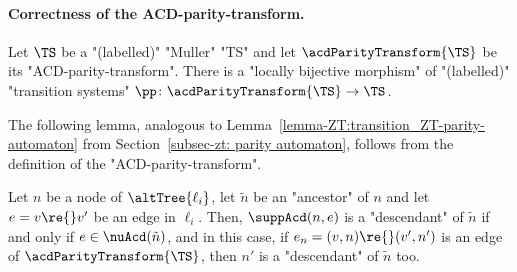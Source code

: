 \documentclass{theoretics}
\begin{document}
\paragraph*{Correctness of the ACD-parity-transform.}

\begin{proposition}\label{prop-ACD:correctness_ACD-parity_transform}
	Let $\TS$ be a "(labelled)" "Muller" "TS" and let $\acdParityTransform{\TS}$ be its "ACD-parity-transform". There is a "locally bijective morphism" of "(labelled)" "transition systems" $\pp\colon \acdParityTransform{\TS} \to \TS$.
\end{proposition}

The following lemma, analogous to Lemma~\ref{lemma-ZT:transition_ZT-parity-automaton} from Section~\ref{subsec-zt: parity automaton}, follows from the definition of the "ACD-parity-transform".
\begin{lemma}\label{lemma-acd:transition_ACD-parity_transform}
	Let $n$ be a node of $\altTree{\ell_i}$, let $\tilde{n}$ be an "ancestor" of $n$ and let $e= v\re{}v'$ be an edge in $\ell_i$. Then, $\suppAcd(n, e)$ is a "descendant" of $\tilde{n}$ if and only if $e\in \nuAcd(\tilde{n})$, and in this case, if $e_n = (v,n)\re{} (v',n')$ is an edge of $\acdParityTransform{\TS}$, then $n'$ is a "descendant" of  $\tilde{n}$ too.
\end{lemma}
\end{document}
